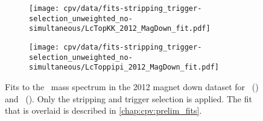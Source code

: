 \begin{figure}
  \begin{subfigure}[b]{0.5\textwidth}
    \texttt{[image: cpv/data/fits-stripping\_trigger-selection\_unweighted\_no-simultaneous/LcTopKK\_2012\_MagDown\_fit.pdf]}
    \caption{\pKK}
    \label{fig:cpv:data:mass:pKK}
  \end{subfigure}
  \begin{subfigure}[b]{0.5\textwidth}
    \texttt{[image: cpv/data/fits-stripping\_trigger-selection\_unweighted\_no-simultaneous/LcToppipi\_2012\_MagDown\_fit.pdf]}
    \caption{\ppipi}
    \label{fig:cpv:data:mass:ppipi}
  \end{subfigure}
  \caption{%
    Fits to the \PLambdac\ mass spectrum in the 2012 magnet down dataset for 
    \pKK\ () and \ppipi\ 
    ().
    Only the stripping and trigger selection is applied.
    The fit that is overlaid is described in \cref{chap:cpv:prelim_fits}.
  }
  \label{fig:cpv:data:mass}
\end{figure}
